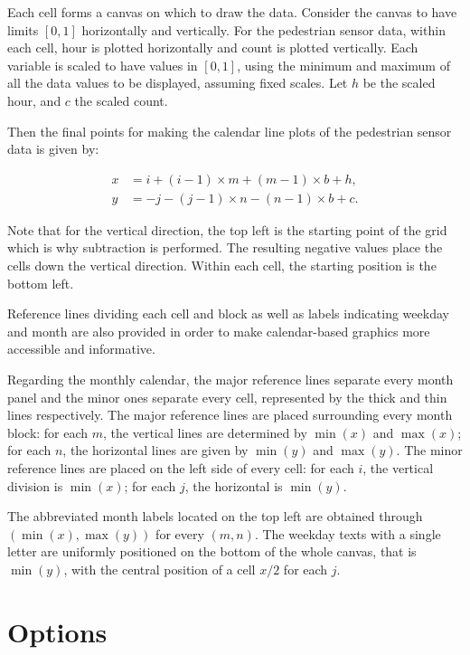 \documentclass[article]{jss}
\theoremstyle{definition}
\theoremstyle{definition}
\theoremstyle{remark}
\begin{document}
Each cell forms a canvas on which to draw the data. Consider the canvas
to have limits \([0, 1]\) horizontally and vertically. For the
pedestrian sensor data, within each cell, hour is plotted horizontally
and count is plotted vertically. Each variable is scaled to have values
in \([0,1]\), using the minimum and maximum of all the data values to be
displayed, assuming fixed scales. Let \(h\) be the scaled hour, and
\(c\) the scaled count.

Then the final points for making the calendar line plots of the
pedestrian sensor data is given by:

\begin{equation}
  \begin{aligned}
  x &= i + (i - 1) \times m + (m - 1) \times b + h, \\
  y &= -j - (j - 1) \times n - (n - 1) \times b + c. \label{eq:final}
  \end{aligned}
\end{equation}

Note that for the vertical direction, the top left is the starting point
of the grid which is why subtraction is performed. The resulting
negative values place the cells down the vertical direction. Within each
cell, the starting position is the bottom left.

Reference lines dividing each cell and block as well as labels
indicating weekday and month are also provided in order to make
calendar-based graphics more accessible and informative.

Regarding the monthly calendar, the major reference lines separate every
month panel and the minor ones separate every cell, represented by the
thick and thin lines respectively. The major reference lines are placed
surrounding every month block: for each \(m\), the vertical lines are
determined by \(\min{(x)}\) and \(\max{(x)}\); for each \(n\), the
horizontal lines are given by \(\min{(y)}\) and \(\max{(y)}\). The minor
reference lines are placed on the left side of every cell: for each
\(i\), the vertical division is \(\min{(x)}\); for each \(j\), the
horizontal is \(\min{(y)}\).

The abbreviated month labels located on the top left are obtained
through \((\min{(x)}, \max{(y)})\) for every \((m, n)\). The weekday
texts with a single letter are uniformly positioned on the bottom of the
whole canvas, that is \(\min{(y)}\), with the central position of a cell
\(x / 2\) for each \(j\).

\section{Options}\label{options}
\end{document}
